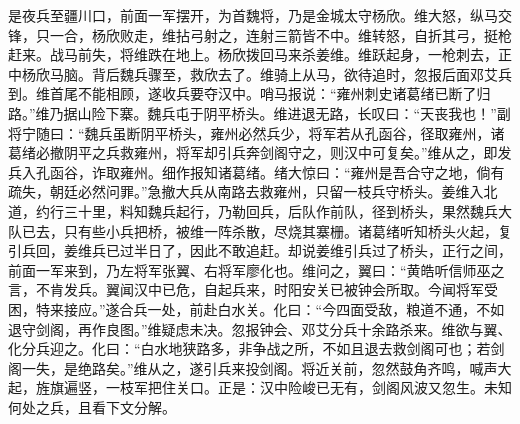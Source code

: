 是夜兵至疆川口，前面一军摆开，为首魏将，乃是金城太守杨欣。维大怒，纵马交锋，只一合，杨欣败走，维拈弓射之，连射三箭皆不中。维转怒，自折其弓，挺枪赶来。战马前失，将维跌在地上。杨欣拨回马来杀姜维。维跃起身，一枪刺去，正中杨欣马脑。背后魏兵骤至，救欣去了。维骑上从马，欲待追时，忽报后面邓艾兵到。维首尾不能相顾，遂收兵要夺汉中。哨马报说：“雍州刺史诸葛绪已断了归路。”维乃据山险下寨。魏兵屯于阴平桥头。维进退无路，长叹曰：“天丧我也！”副将宁随曰：“魏兵虽断阴平桥头，雍州必然兵少，将军若从孔函谷，径取雍州，诸葛绪必撤阴平之兵救雍州，将军却引兵奔剑阁守之，则汉中可复矣。”维从之，即发兵入孔函谷，诈取雍州。细作报知诸葛绪。绪大惊曰：“雍州是吾合守之地，倘有疏失，朝廷必然问罪。”急撤大兵从南路去救雍州，只留一枝兵守桥头。姜维入北道，约行三十里，料知魏兵起行，乃勒回兵，后队作前队，径到桥头，果然魏兵大队已去，只有些小兵把桥，被维一阵杀散，尽烧其寨栅。诸葛绪听知桥头火起，复引兵回，姜维兵已过半日了，因此不敢追赶。却说姜维引兵过了桥头，正行之间，前面一军来到，乃左将军张翼、右将军廖化也。维问之，翼曰：“黄皓听信师巫之言，不肯发兵。翼闻汉中已危，自起兵来，时阳安关已被钟会所取。今闻将军受困，特来接应。”遂合兵一处，前赴白水关。化曰：“今四面受敌，粮道不通，不如退守剑阁，再作良图。”维疑虑未决。忽报钟会、邓艾分兵十余路杀来。维欲与翼、化分兵迎之。化曰：“白水地狭路多，非争战之所，不如且退去救剑阁可也；若剑阁一失，是绝路矣。”维从之，遂引兵来投剑阁。将近关前，忽然鼓角齐鸣，喊声大起，旌旗遍竖，一枝军把住关口。正是：汉中险峻已无有，剑阁风波又忽生。未知何处之兵，且看下文分解。